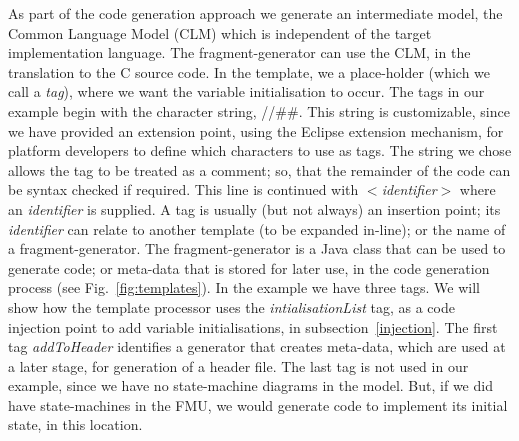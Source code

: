 \documentclass{llncs}%
\begin{document}
As part of the code generation approach we generate an intermediate model, the Common Language Model (CLM) which is independent of the target implementation language. The fragment-generator can use the CLM, in the translation to the C source code.  In the template, we a place-holder (which we call a \emph{tag}), where we want the variable initialisation to occur. The tags in our example begin with the character string, //\#\#.  This string is customizable, since we have provided an extension point, using the Eclipse extension mechanism, for platform developers to define which characters to use as tags.  The string we chose allows the tag to be treated as a comment; so, that the remainder of the code can be syntax checked if required. This line is continued with $<$\emph{identifier}$>$ where an \emph{identifier} is supplied. A tag is usually (but not always) an insertion point; its \emph{identifier} can relate to another template (to be expanded in-line); or the name of a fragment-generator. The fragment-generator is a Java class that can be used to generate code; or meta-data that is stored for later use, in the code generation process  (see Fig.~\ref{fig:templates}). In the example we have three tags. We will show how the template processor uses the \emph{intialisationList} tag, as a code injection point to add variable initialisations, in subsection~\ref{injection}. The first tag \emph{addToHeader} identifies a generator that creates meta-data, which are used at a later stage, for generation of a header file. The last tag is not used in our example, since we have no state-machine diagrams in the model. But, if we did have state-machines in the FMU, we would generate code to implement its initial state, in this location.
%
\end{document}
